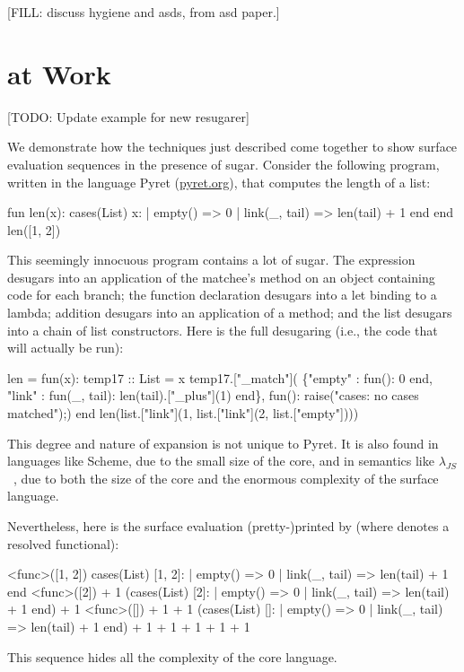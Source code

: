 [FILL: discuss hygiene and asds, from asd paper.]


\section{{\Resugarer} at Work}
\label{sec:reval-pyret-example}

[TODO: Update example for new resugarer]

We demonstrate how the techniques just described come together to show
surface evaluation sequences in the presence of sugar. Consider the
following program, written in the language Pyret (\url{pyret.org}), 
that computes the length of a list:
\begin{Codes}
    fun len(x):
      cases(List) x:
        | empty() => 0
        | link(_, tail) => len(tail) + 1
      end
    end
    len([1, 2])
\end{Codes}
This seemingly innocuous program contains a lot of sugar. The 
expression desugars into an application of the matchee's 
method on an object containing code for each branch; the function
declaration desugars into a let binding to a lambda; addition desugars
into an application of a  method; and the list \Code{[1, 2]}
desugars into a chain of list constructors. Here is the full desugaring
(i.e., the code that will actually be run):
\begin{Codes}
len = fun(x):
    temp17 :: List = x
    temp17.["_match"](
      \{"empty" : fun(): 0 end,
       "link" : fun(_, tail):
                len(tail).["_plus"](1) end\},
      fun(): raise("cases: no cases matched");)
    end
len(list.["link"](1, list.["link"](2, list.["empty"])))
\end{Codes}
This degree and nature of expansion is not unique to Pyret.
It is also found in languages like Scheme, due
to the small size of the core, and in semantics like
$\lambda_{JS}$~\cite{lambda-js},
due to both the size of the core and the enormous complexity
of the surface language.

Nevertheless, here is the surface evaluation (pretty-)printed by {\Resugarer} (where
 denotes a resolved functional):
\begin{Codes}
\SurfStep <func>([1, 2])
\SurfStep cases(List) [1, 2]:
      | empty() => 0
      | link(_, tail) => len(tail) + 1
    end
\SurfStep <func>([2]) + 1
\SurfStep (cases(List) [2]:
      | empty() => 0
      | link(_, tail) => len(tail) + 1
    end) + 1
\SurfStep <func>([]) + 1 + 1
\SurfStep (cases(List) []:
      | empty() => 0
      | link(_, tail) => len(tail) + 1
    end) + 1 + 1
 + 1 + 1
 + 1
\end{Codes}
This sequence hides all the complexity of the core language.

